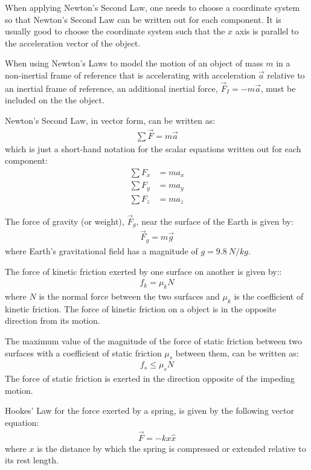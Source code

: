 \begin{chapterSummary}
When applying Newton's Second Law, one needs to choose a coordinate system so that Newton's Second Law can be written out for each component. It is usually good to choose the coordinate system such that the $x$ axis is parallel to the acceleration vector of the object.

When using Newton's Laws to model the motion of an object of mass $m$ in a non-inertial frame of reference that is accelerating with acceleration $\vec a$ relative to an inertial frame of reference, an additional inertial force, $\vec F_I=-m\vec a$, must be included on the the object.
\end{chapterSummary}

\begin{importantEquations}
Newton's Second Law, in vector form, can be written as:
\begin{align*}
\sum \vec F = m\vec a
\end{align*}
which is just a short-hand notation for the scalar equations written out for each component:
\begin{align*}
\sum F_x &= ma_x \\
\sum F_y &= ma_y \\
\sum F_z &= ma_z
\end{align*}

The force of gravity (or weight), $\vec F_g$, near the surface of the Earth is given by:
\begin{align*}
\vec F_g = m\vec g
\end{align*}
where Earth's gravitational field has a magnitude of $g=\SI{9.8}{N/kg}$.

The force of kinetic friction exerted by one surface on another is given by::
\begin{align*}
f_k=\mu_kN
\end{align*}
where $N$ is the normal force between the two surfaces and $\mu_k$ is the coefficient of kinetic friction. The force of kinetic friction on a object is in the opposite direction from its motion.

The maximum value of the magnitude of the force of static friction between two surfaces with a coefficient of static friction $\mu_s$ between them, can be written as:
\begin{align*}
f_s\leq\mu_sN
\end{align*}
The force of static friction is exerted in the direction opposite of the impeding motion.

Hookes' Law for the force exerted by a spring, is given by the following vector equation:
\begin{align*}
\vec F = -kx \hat x
\end{align*}
where $x$ is the distance by which the spring is compressed or extended relative to its rest length.
\end{importantEquations}


